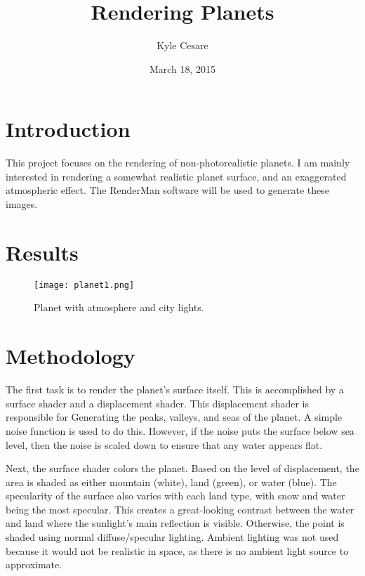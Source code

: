 \documentclass[12pt,letterpaper,titlepage]{article}
\title{Rendering Planets}
\date{March 18, 2015}
\author{Kyle Cesare}
\begin{document}
\maketitle

\section{Introduction}
This project focuses on the rendering of non-photorealistic planets. I am mainly
interested in rendering a somewhat realistic planet surface, and an exaggerated
atmospheric effect. The RenderMan software will be used to generate these
images.

\section{Results}
\begin{figure}[H]
  \centering
  \texttt{[image: planet1.png]}
  \caption{Planet with atmosphere and city lights.}
\end{figure}


\section{Methodology}
The first task is to render the planet's surface itself. This is accomplished by
a surface shader and a displacement shader. This displacement shader is
responsible for Generating the peaks, valleys, and seas of the planet. A simple
noise function is used to do this. However, if the noise puts the surface below
sea level, then the noise is scaled down to ensure that any water appears flat.

Next, the surface shader colors the planet. Based on the level of displacement,
the area is shaded as either mountain (white), land (green), or water (blue).
The specularity of the surface also varies with each land type, with snow and
water being the most specular. This creates a great-looking contrast between the
water and land where the sunlight's main reflection is visible. Otherwise, the
point is shaded using normal diffuse/specular lighting. Ambient lighting was not
used because it would not be realistic in space, as there is no ambient light
source to approximate.
\end{document}
